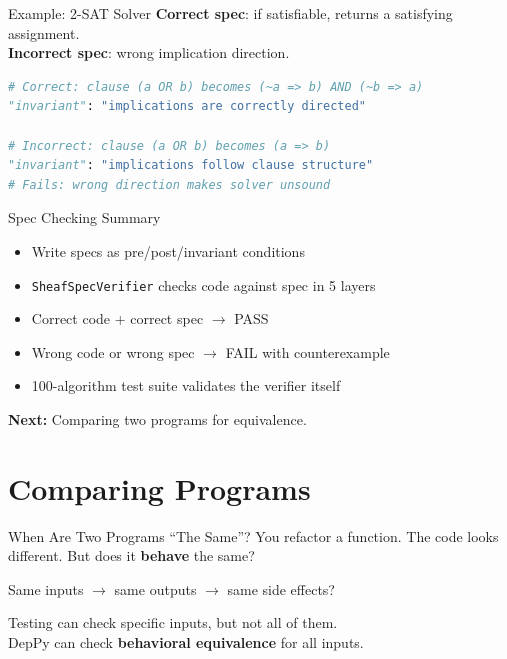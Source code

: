 \documentclass[aspectratio=169,10pt]{beamer}
\begin{document}
\begin{frame}[fragile]{Example: 2-SAT Solver}
\textbf{Correct spec}: if satisfiable, returns a satisfying assignment.\\
\textbf{Incorrect spec}: wrong implication direction.
\vspace{0.3em}
\begin{lstlisting}[language=Python, basicstyle=\ttfamily\scriptsize]
# Correct: clause (a OR b) becomes (~a => b) AND (~b => a)
"invariant": "implications are correctly directed"

# Incorrect: clause (a OR b) becomes (a => b)
"invariant": "implications follow clause structure"
# Fails: wrong direction makes solver unsound
\end{lstlisting}
\end{frame}

\begin{frame}{Spec Checking Summary}
\begin{itemize}
  \item Write specs as pre/post/invariant conditions
  \item \texttt{SheafSpecVerifier} checks code against spec in 5 layers
  \item Correct code + correct spec $\to$ \textcolor{safe}{PASS}
  \item Wrong code or wrong spec $\to$ \textcolor{danger}{FAIL} with counterexample
  \item 100-algorithm test suite validates the verifier itself
\end{itemize}
\vspace{0.3em}
\begin{center}
\textbf{Next:} Comparing two programs for equivalence.
\end{center}
\end{frame}

\section{Comparing Programs}

\begin{frame}{When Are Two Programs ``The Same''?}
You refactor a function. The code looks different. But does it \textbf{behave} the same?
\vspace{0.5em}
\begin{center}
Same inputs $\to$ same outputs $\to$ same side effects?
\end{center}
\vspace{0.3em}
Testing can check specific inputs, but not all of them.\\
DepPy can check \textbf{behavioral equivalence} for all inputs.
\end{frame}
\end{document}
